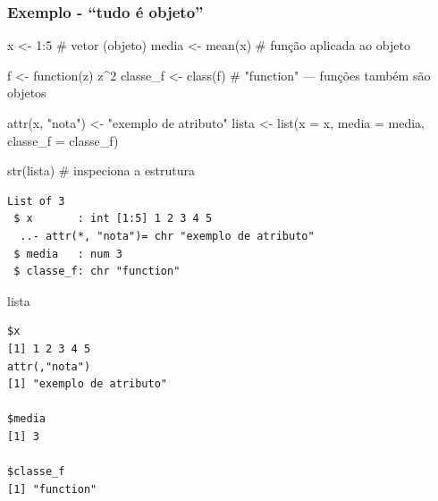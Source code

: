 \documentclass[
  letterpaper,
  DIV=11,
  numbers=noendperiod]{scrreprt}
\newenvironment{Shaded}{\begin{snugshade}}{\end{snugshade}}
\newcommand{\AttributeTok}[1]{\textcolor[rgb]{0.40,0.45,0.13}{#1}}
\newcommand{\CommentTok}[1]{\textcolor[rgb]{0.37,0.37,0.37}{#1}}
\newcommand{\ControlFlowTok}[1]{\textcolor[rgb]{0.00,0.23,0.31}{#1}}
\newcommand{\DecValTok}[1]{\textcolor[rgb]{0.68,0.00,0.00}{#1}}
\newcommand{\FunctionTok}[1]{\textcolor[rgb]{0.28,0.35,0.67}{#1}}
\newcommand{\NormalTok}[1]{\textcolor[rgb]{0.00,0.23,0.31}{#1}}
\newcommand{\OtherTok}[1]{\textcolor[rgb]{0.00,0.23,0.31}{#1}}
\newcommand{\SpecialCharTok}[1]{\textcolor[rgb]{0.37,0.37,0.37}{#1}}
\newcommand{\StringTok}[1]{\textcolor[rgb]{0.13,0.47,0.30}{#1}}
\begin{document}
\subsubsection*{Exemplo - ``tudo é
objeto''}\label{exemplo---tudo-uxe9-objeto}

\begin{Shaded}
\begin{Highlighting}[]
\NormalTok{x }\OtherTok{\textless{}{-}} \DecValTok{1}\SpecialCharTok{:}\DecValTok{5}               \CommentTok{\# vetor (objeto)}
\NormalTok{media }\OtherTok{\textless{}{-}} \FunctionTok{mean}\NormalTok{(x)       }\CommentTok{\# função aplicada ao objeto}

\NormalTok{f }\OtherTok{\textless{}{-}} \ControlFlowTok{function}\NormalTok{(z) z}\SpecialCharTok{\^{}}\DecValTok{2}
\NormalTok{classe\_f }\OtherTok{\textless{}{-}} \FunctionTok{class}\NormalTok{(f)   }\CommentTok{\# "function" — funções também são objetos}

\FunctionTok{attr}\NormalTok{(x, }\StringTok{"nota"}\NormalTok{) }\OtherTok{\textless{}{-}} \StringTok{"exemplo de atributo"}
\NormalTok{lista }\OtherTok{\textless{}{-}} \FunctionTok{list}\NormalTok{(}\AttributeTok{x =}\NormalTok{ x, }\AttributeTok{media =}\NormalTok{ media, }\AttributeTok{classe\_f =}\NormalTok{ classe\_f)}

\FunctionTok{str}\NormalTok{(lista)             }\CommentTok{\# inspeciona a estrutura}
\end{Highlighting}
\end{Shaded}

\begin{verbatim}
List of 3
 $ x       : int [1:5] 1 2 3 4 5
  ..- attr(*, "nota")= chr "exemplo de atributo"
 $ media   : num 3
 $ classe_f: chr "function"
\end{verbatim}

\begin{Shaded}
\begin{Highlighting}[]
\NormalTok{lista}
\end{Highlighting}
\end{Shaded}

\begin{verbatim}
$x
[1] 1 2 3 4 5
attr(,"nota")
[1] "exemplo de atributo"

$media
[1] 3

$classe_f
[1] "function"
\end{verbatim}
\end{document}
